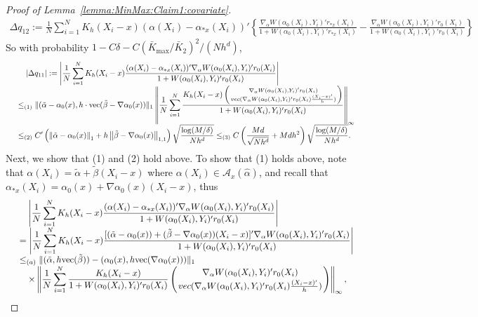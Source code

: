 \documentclass[11pt]{article}
\newcommand{\norm}[1]{\left\lVert #1 \right\rVert}
\begin{document}
\begin{proof}[Proof of Lemma~\ref{lemma:MinMax:Claim1:covariate}]
$$\begin{array}{rl}
\displaystyle\Delta q_{12}\!:=\!\frac{1}{N}\!\!\sum_{i=1}^N\!\!K_h(X_i-x)(\alpha(X_i) - \alpha_{*x}(X_i))'\!\!\left\{\!\frac{\nabla_\alpha W(\alpha_0(X_i),Y_i)'r_{*x}(X_i)}{1+W(\alpha_0(X_i),Y_i)'r_{*x}(X_i)}\! -\! \frac{ \nabla_\alpha W(\alpha_0(X_i),Y_i)'r_0(X_i)}{1+W(\alpha_0(X_i),Y_i)'r_0(X_i)}\!\right\}
\end{array}$$
So with probability $1-C\delta-C(\bar{K}_{\max}/\bar{K}_2)^2/(Nh^d)$,
$$\begin{array}{rl}
&\quad\displaystyle|\Delta q_{11}|:= \left|\frac{1}{N}\sum_{i=1}^N K_h(X_i-x)\frac{(\alpha(X_i) - \alpha_{*x}(X_i))'\nabla_\alpha W(\alpha_0(X_i),Y_i)'r_0(X_i)}{1+W(\alpha_0(X_i),Y_i)'r_0(X_i)} \right|\\
&\displaystyle\leq_{(1)}\| (\tilde{\alpha}-\alpha_0(x),h\cdot\mathrm{vec}(\tilde{\beta}-\nabla \alpha_0(x))\|_1\left\| \frac{1}{N}\sum_{i=1}^N\frac{K_h(X_i-x)\left( { \nabla_\alpha W(\alpha_{0}(X_i),Y_i)'r_0(X_i)}\atop{ {\rm vec}( \nabla_\alpha W(\alpha_{0}(X_i),Y_i)'r_0(X_i)\frac{(X_i-x)'}{h} )}\right) }{1+W(\alpha_{0}(X_i),Y_i)^\prime r_0(X_i)}\right\|_\infty \\
&\displaystyle\leq_{(2)}C'\left(\norm{\tilde{\alpha}-\alpha_0(x)}_1+h\norm{\tilde{\beta}-\nabla\alpha_0(x)}_{1,1}\right)\sqrt{\frac{\log (M/\delta)}{N{h^d}}}\leq_{(3)}C\left(\frac{Md}{\sqrt{Nh^{d}}}+Mdh^2\right)\sqrt{\frac{\log (M/\delta)}{N{h^d}}}.
\end{array}$$
Next, we show that (1) and (2) hold above. 
To show that (1) holds above, note that $\alpha(X_i)=\tilde{\alpha}+\tilde{\beta}(X_i-x)$ where $\alpha(X_i)\in\mathcal{A}_x(\hat{\alpha})$, and recall that $\alpha_{*x}(X_i)=\alpha_0(x)+\nabla\alpha_0(x)(X_i-x)$, thus 
$$\begin{array}{rl}
&\displaystyle\quad\left|\frac{1}{N}\sum_{i=1}^N K_h(X_i-x)\frac{(\alpha(X_i) - \alpha_{*x}(X_i))'\nabla_\alpha W(\alpha_0(X_i),Y_i)'r_0(X_i)}{1+W(\alpha_0(X_i),Y_i)'r_0(X_i)}\right|\\
&\displaystyle=\left|\frac{1}{N}\sum_{i=1}^N K_h(X_i-x)\frac{[(\tilde{\alpha}-\alpha_0(x))+(\tilde{\beta}-\nabla\alpha_0(x))(X_i-x)]'\nabla_\alpha W(\alpha_0(X_i),Y_i)'r_0(X_i)}{1+W(\alpha_0(X_i),Y_i)'r_0(X_i)}\right|\\
&\displaystyle\leq_{(a)}\| (\tilde{\alpha},h\mathrm{vec}(\tilde{\beta}))-(\alpha_0(x),h\mathrm{vec}(\nabla \alpha_0(x)))\|_1\\ 
&\displaystyle\quad\times\left\| \frac{1}{N}\sum_{i=1}^N\frac{  K_h(X_i-x) }{1+W(\alpha_{0}(X_i),Y_i)^\prime r_0(X_i)} \left( { \nabla_\alpha W(\alpha_{0}(X_i),Y_i)'r_0(X_i)}\atop{ {\rm vec}( \nabla_\alpha W(\alpha_{0}(X_i),Y_i)'r_0(X_i)\frac{(X_i-x)'}{h} )}\right) \right\|_\infty, 

\end{array}$$
\end{proof}
\end{document}
